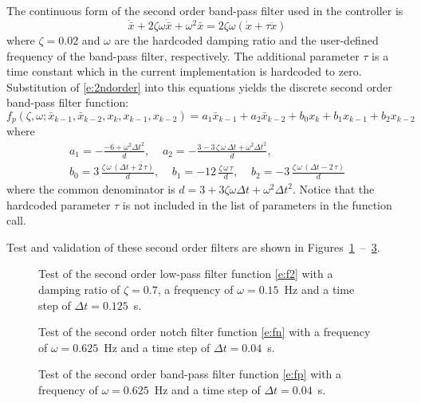 The continuous form of the second order band-pass filter used in the controller is
\begin{equation}
\label{e:fpcont}
\ddot{\bar x} + 2 \zeta \omega \dot{\bar x} + \omega^2\bar x = 2 \zeta \omega \left(\dot{x} + \tau \ddot{x}\right)
\end{equation}
where $\zeta=0.02$ and $\omega$ are the hardcoded damping ratio and the user-defined frequency of the band-pass filter, respectively. The additional parameter $\tau$ is a time constant which in the current implementation is hardcoded to zero. Substitution of \eqref{e:2ndorder} into this equations yields the discrete second order band-pass filter function:
\begin{equation}
\label{e:fp}
f_p \left(\zeta, \omega; \bar x_{k-1} , \bar x_{k-2} , x_{k} , x_{k-1} , x_{k-2} \right) = a_1 \bar x_{k-1} + a_2 \bar x_{k-2} + b_0 x_k + b_1 x_{k-1}+ b_2 x_{k-2}
\end{equation}
where
\begin{gather}\nonumber
a_1 =-{\frac {-6+{\omega}^{2}{\Delta t}^{2}}{d}},\;\;\;\;
a_2 =-{\frac {3-3\,\zeta\,\omega\,\Delta t+{\omega}^{2}{\Delta t}^{2}}{d}}, \\
\label{e:fpcoef}
b_0 =3\,{\frac {\zeta\,\omega\, \left( \Delta t+2\,\tau \right) }{d}},\;\;\;\;
b_1 =-12\,{\frac {\zeta\,\omega\,\tau}{d}},\;\;\;\;
b_2 =-3\,{\frac {\zeta\,\omega\, \left( \Delta t-2\,\tau \right) }{d}}
\end{gather}
where the common denominator is $d=3+3 \zeta \omega \Delta t+\omega^2 \Delta t^2$. Notice that the hardcoded parameter $\tau$ is not included in the list of parameters in the function call.

Test and validation of these second order filters are shown in Figures~\ref{f:f2}~--~\ref{f:fp}.

\begin{figure}[b!]
\centerline{ }
\caption{Test of the second order low-pass filter function \eqref{e:f2} with a damping ratio of $\zeta=0.7$, a frequency of $\omega=0.15$~Hz and a time step of $\Delta t = 0.125$~s. \label{f:f2}}
\end{figure}

\begin{figure}[t]
\centerline{ }
\caption{Test of the second order notch filter function \eqref{e:fn} with a frequency of $\omega=0.625$~Hz and a time step of $\Delta t = 0.04$~s. \label{f:fn}}
\end{figure}

\begin{figure}[t]
\centerline{ }
\caption{Test of the second order band-pass filter function \eqref{e:fp} with a frequency of $\omega=0.625$~Hz and a time step of $\Delta t = 0.04$~s. \label{f:fp}}
\end{figure}

